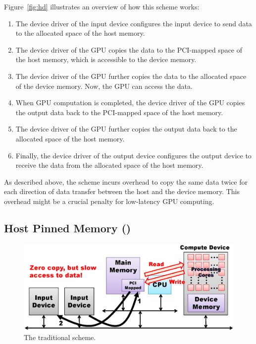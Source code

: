 Figure~\ref{fig:hd} illustrates an overview of how this scheme works:
\begin{enumerate} \itemsep1pt
 \item The device driver of the input device configures the input device
       to send data to the allocated space of the host memory.
 \item The device driver of the GPU copies the data to the
       PCI-mapped space of the host memory, which is accessible to the
       device memory.
 \item The device driver of the GPU further copies the data to the
       allocated space of the device memory.
       Now, the GPU can access the data.
 \item When GPU computation is completed, the device driver of the
       GPU copies the output data back to the PCI-mapped space of the
       host memory.
 \item The device driver of the GPU further copies the output data back
       to the allocated space of the host memory.
 \item Finally, the device driver of the output device configures the
       output device to receive the data from the allocated space of the
       host memory.
\end{enumerate}

As described above, the {\hd} scheme incurs overhead to copy the same
data twice for each direction of data transfer between the host and the
device memory.
This overhead might be a crucial penalty for low-latency GPU computing.

\subsection{Host Pinned Memory ({\hp})}
\label{sec:hp}

\begin{figure}[!t]
 \centering
 \includegraphics[width=\hsize]{eps/hp.eps}
 \caption{The traditional {\hp} scheme.}
 \label{fig:hp}
\end{figure}


